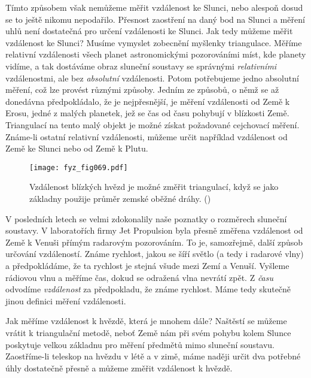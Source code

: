 {    Tímto způsobem však nemůžeme měřit vzdálenost ke Slunci, nebo alespoň dosud se to ještě nikomu 
    nepodařilo. Přesnost zaostření na daný bod na Slunci a měření uhlů není dostatečná pro určení 
    vzdálenosti ke Slunci. Jak tedy můžeme měřit vzdálenost ke Slunci? Musíme vymyslet zobecnění 
    myšlenky triangulace. Měříme relativní vzdálenosti všech planet astronomickými pozorováními 
    míst, kde planety vidíme, a tak dostáváme obraz sluneční soustavy se správnými 
    \emph{relativními} vzdálenostmi, ale bez \emph{absolutní} vzdálenosti. Potom potřebujeme jedno 
    absolutní měření, což lze provést různými způsoby. Jedním ze způsobů, o němž se až donedávna 
    předpokládalo, že je nejpřesnější, je měření vzdálenosti od Země k Erosu, jedné z malých 
    planetek, jež se čas od času pohybují v blízkosti Země. Triangulací na tento malý objekt je 
    možné získat požadované cejchovací měření. Známe-li ostatní relativní vzdálenosti, můžeme určit 
    například vzdálenost od Země ke Slunci nebo od Země k Plutu.
    
    \begin{figure}[ht!]  %
      \centering
      \texttt{[image: fyz\_fig069.pdf]}
      \caption{Vzdálenost blízkých hvězd je možné změřit triangulací, když se jako základny použije 
               průměr zemské oběžné dráhy. (\cite[s.~71]{Feynman01})}
      \label{fyz:fig069}
    \end{figure}     
    V posledních letech se velmi zdokonalily naše poznatky o rozměrech sluneční soustavy. V 
    laboratořích firmy Jet Propulsion byla přesně změřena vzdálenost od Země k Venuši přímým 
    radarovým pozorováním. To je, samozřejmě, další způsob určování vzdáleností. Známe rychlost, 
    jakou se šíří světlo (a tedy i radarové vlny) a předpokládáme, že ta rychlost je stejná všude 
    mezi Zemí a Venuší. Vyšleme rádiovou vlnu a měříme čas, dokud se odražená vlna nevrátí zpět. Z 
    \emph{času} odvodíme \emph{vzdálenost} za předpokladu, že známe rychlost. Máme tedy skutečně 
    jinou definici měření vzdálenosti.
    
    Jak měříme vzdálenost k hvězdě, která je mnohem dále? Naštěstí se můžeme vrátit k triangulační 
    metodě, neboť Země nám při svém pohybu kolem Slunce poskytuje velkou základnu pro měření 
    předmětů mimo sluneční soustavu. Zaostříme-li teleskop na hvězdu v létě a v zimě, máme naději 
    určit dva potřebné úhly dostatečně přesně a můžeme změřit vzdálenost k hvězdě.
   
}

